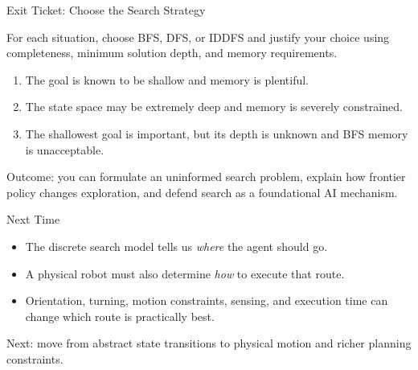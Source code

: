 \documentclass[aspectratio=169,10pt]{beamer}
\begin{document}
\begin{frame}[shrink=20]{Exit Ticket: Choose the Search Strategy}
  \begin{activity}
    For each situation, choose BFS, DFS, or IDDFS and justify your choice using completeness, minimum solution depth, and memory requirements.
    \begin{enumerate}
      \item The goal is known to be shallow and memory is plentiful.
      \item The state space may be extremely deep and memory is severely constrained.
      \item The shallowest goal is important, but its depth is unknown and BFS memory is unacceptable.
    \end{enumerate}
  \end{activity}

  \begin{keyidea}
    Outcome: you can formulate an uninformed search problem, explain how frontier policy changes exploration, and defend search as a foundational AI mechanism.
  \end{keyidea}
\end{frame}

\begin{frame}[shrink=20]{Next Time}
  \begin{itemize}
    \item The discrete search model tells us \emph{where} the agent should go.
    \item A physical robot must also determine \emph{how} to execute that route.
    \item Orientation, turning, motion constraints, sensing, and execution time can change which route is practically best.
  \end{itemize}

  \begin{keyidea}
    Next: move from abstract state transitions to physical motion and richer planning constraints.
  \end{keyidea}
\end{frame}
\end{document}
